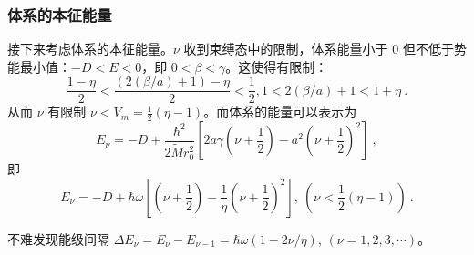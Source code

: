 \subsubsection{体系的本征能量}
接下来考虑体系的本征能量。$\nu$ 收到束缚态中的限制，体系能量小于 $0$ 但不低于势能最小值：$-D < E < 0$，即 $0 < \beta < \gamma$。这使得有限制：
\begin{equation}
\frac{1-\eta}2 < \frac{(2 (\beta/a) + 1) - \eta}2 < \frac12, 1 < 2 (\beta/a) + 1 <  1 + \eta ~.
\end{equation}
从而 $\nu$ 有限制 $\nu < V_m = \frac{1}{2} (\eta-1)$。而体系的能量可以表示为
\begin{equation}
E_\nu = -D + \frac{\hbar^2}{2 \widetilde M r_0^2} \left[2a\gamma\left(\nu+\frac12\right) - a^2 \left(\nu + \frac12\right)^2\right] ~,
\end{equation}
即
\begin{equation}
E_\nu = -D + \hbar \omega \left[\left(\nu+\frac12\right) - \frac1\eta \left(\nu + \frac12\right)^2\right], \ \left(\nu < \frac12 (\eta - 1)\right) ~.
\end{equation}

不难发现能级间隔 $\Delta E_\nu = E_\nu - E_{\nu - 1} = \hbar \omega (1 - 2 \nu / \eta)$,  $(\nu = 1, 2, 3, \cdots)$。